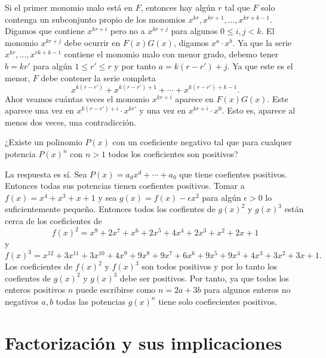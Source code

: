\begin{solution}
    Si el primer monomio malo está en $F$, entonces hay algún $r$ tal que $F$ solo contenga un subconjunto propio de los monomios $x^{kr}, x^{kr + 1}, \ldots, x^{kr + k - 1}$.
    Digamos que contiene $x^{kr + i}$ pero no a $x^{kr + j}$ para algunos $0 \leq i, j < k$.
    El monomio $x^{kr + j}$ debe ocurrir en $F(x) G(x)$, digamos $x^a \cdot x^b$.
    Ya que la serie $x^{kr}, \ldots, x^{rk + k - 1}$ contiene el monomio malo con menor grado, debemo tener $b = kr'$ para algún $1 \leq r' \leq r$ y por tanto $a = k(r - r') + j$.
    Ya que este es el menor, $F$ debe contener la serie completa
    \[
        x^{k(r - r')} + x^{k(r - r') + 1} + \cdots + x^{k(r - r') + k - 1}.
    \]
    Ahor veamos cuántas veces el monomio $x^{kr + i}$ aparece en $F(x) G(x)$.
    Este aparece una vez en $x^{k(r - r') + i} \cdot x^{kr'}$ y una vez en $x^{kr + i}\cdot x^0$.
    Esto es, aparece al menos dos veces, una contradicción.
\end{solution}

\begin{example}
    ¿Existe un polinomio $P(x)$ con un coeficiente negativo tal que para cualquer potencia $P(x)^n$ con $n > 1$ todos los coeficientes son positivos?
\end{example}
\begin{solution}
    La respuesta es sí.
    Sea $P(x) = a_d x^d + \cdots + a_0$ que tiene coefientes positivos.
    Entonces todas sus potencias tienen coefientes positivos.
    Tomar a $f(x) = x^4 + x^3 + x + 1$ y sea $g(x) = f(x) - \epsilon x^2$ para algún $\epsilon > 0$ lo suficientemente pequeño.
    Entonces todos los coefientes de $g(x)^2$ y $g(x)^3$ están cerca de los coeficientes de
    \[
        f(x)^2 = x^9 + 2x^7 + x^6 + 2x^5 + 4x^4 + 2x^3 + x^2 + 2x + 1
    \]
    y
    \[
        f(x)^3 = x^{12} + 3x^{11} + 3x^{10} + 4x^9 + 9x^8 + 9x^7 + 6x^6 + 9x^5 + 9x^4 + 4x^3 + 3x^2 + 3x + 1.
    \]
    Los coeficientes de $f(x)^2$ y $f(x)^3$ son todos positivos y por lo tanto los coefientes de $g(x)^2$ y $g(x)^3$ debe ser positivos.
    Por tanto, ya que todos los enteros positivos $n$ puede escribirse como $n = 2a + 3b$ para algunos enteros no negativos $a, b$ todas las potencias $g(x)^n$ tiene solo coefiecientes positivos.
\end{solution}



\section{Factorización y sus implicaciones}

